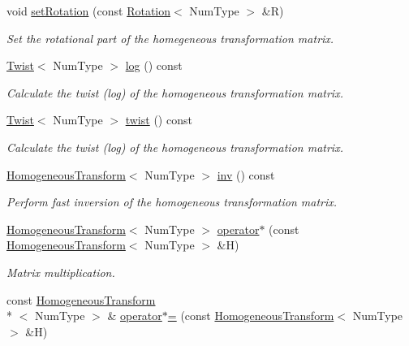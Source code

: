\begin{DoxyCompactItemize}
void \hyperlink{classscrews_1_1_homogeneous_transform_aff5a72c974f2e318172f040e47efb2dc}{set\+Rotation} (const \hyperlink{singletonscrews_1_1_rotation}{Rotation}$<$ Num\+Type $>$ \&R)
\begin{DoxyCompactList}\small\item\em Set the rotational part of the homegeneous transformation matrix. \end{DoxyCompactList}\item 
\hyperlink{singletonscrews_1_1_twist}{Twist}$<$ Num\+Type $>$ \hyperlink{classscrews_1_1_homogeneous_transform_a8e3d44103e1766c8f013c92297725e35}{log} () const 
\begin{DoxyCompactList}\small\item\em Calculate the twist (log) of the homogeneous transformation matrix. \end{DoxyCompactList}\item 
\hyperlink{singletonscrews_1_1_twist}{Twist}$<$ Num\+Type $>$ \hyperlink{classscrews_1_1_homogeneous_transform_a8dd7f05a1bf120cc927408e67deff45d}{twist} () const 
\begin{DoxyCompactList}\small\item\em Calculate the twist (log) of the homogeneous transformation matrix. \end{DoxyCompactList}\item 
\hyperlink{classscrews_1_1_homogeneous_transform}{Homogeneous\+Transform}$<$ Num\+Type $>$ \hyperlink{classscrews_1_1_homogeneous_transform_abaebb536e17565b5ba22f2122e2d85b6}{inv} () const 
\begin{DoxyCompactList}\small\item\em Perform fast inversion of the homogeneous transformation matrix. \end{DoxyCompactList}\item 
\hyperlink{classscrews_1_1_homogeneous_transform}{Homogeneous\+Transform}$<$ Num\+Type $>$ \hyperlink{classscrews_1_1_homogeneous_transform_a68cb5139adf43354a5259385f7807dff}{operator$\ast$} (const \hyperlink{classscrews_1_1_homogeneous_transform}{Homogeneous\+Transform}$<$ Num\+Type $>$ \&H)
\begin{DoxyCompactList}\small\item\em Matrix multiplication. \end{DoxyCompactList}\item 
const \hyperlink{classscrews_1_1_homogeneous_transform}{Homogeneous\+Transform}\\*
$<$ Num\+Type $>$ \& \hyperlink{classscrews_1_1_homogeneous_transform_a37c5add16b4ed6a22cc730889a540026}{operator$\ast$=} (const \hyperlink{classscrews_1_1_homogeneous_transform}{Homogeneous\+Transform}$<$ Num\+Type $>$ \&H)

\end{DoxyCompactItemize}
